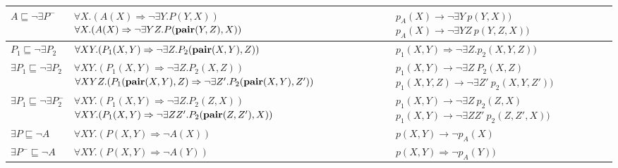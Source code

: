 \begin{longtable}{| p{2cm} | p{8.2cm} | p{5.2cm} |}
	\hline
		$A \sqsubseteq \neg \exists P^{-}$	
		&
		$\forall X. (A(X) \Rightarrow \neg \exists Y. P(Y,X)) $ \newline
		$\forall X. (A(X) \Rightarrow \neg \exists Y Z. P(\pair{Y,Z},X)) $
		&
$p_A(X) \rightarrow \neg \exists Y~p(Y,X)) $ \newline
		$p_A(X) \rightarrow \neg \exists Y Z~ p(Y,Z,X)) $
	\\
	
	\hline
		$P_1 \sqsubseteq \neg \exists P_2$	
		&
		$\forall X Y. (P_1(X,Y) \Rightarrow \neg \exists Z. P_2(\pair{X,Y},Z))$
		&
		$p_1(X,Y) \Rightarrow \neg \exists Z. p_2(X,Y,Z))$
	\\
	
	\hline
		$\exists P_1 \sqsubseteq \neg \exists P_2$	
		&
		$\forall X Y. (P_1(X,Y) \Rightarrow \neg \exists Z. P_2(X,Z)) $ \newline
		$\forall X  Y Z .(P_1(\pair{X,Y},Z) \Rightarrow \neg \exists Z' . P_2(\pair{X,Y},Z'))$
		&
		$p_1(X,Y) \rightarrow \neg \exists Z~P_2(X,Z) $ \newline
		$p_1(X,Y,Z) \rightarrow \neg \exists Z' ~p_2(X,Y,Z'))$
	\\
	
	\hline
		$\exists P_1 \sqsubseteq \neg \exists P_2^{-}$	
		&
		$\forall X  Y. (P_1(X,Y) \Rightarrow \neg \exists Z. P_2(Z,X)) $ \newline
		$\forall X  Y. (P_1(X,Y) \Rightarrow \neg \exists Z  Z' . P_2(\pair{Z,Z'},X)) $
		&
		$p_1(X,Y) \rightarrow \neg \exists Z~ p_2(Z,X) $ \newline
		$p_1(X,Y) \rightarrow \neg \exists Z  Z' ~p_2(Z,Z',X)) $
	\\
	
	\hline
		$\exists P \sqsubseteq \neg A$
		&
		$\forall X Y. (P(X,Y) \Rightarrow \neg A(X)) $
		&
$p(X,Y) \rightarrow \neg p_A(X) $
	\\
	
	\hline
		$\exists P^{-} \sqsubseteq \neg A$
		&
		$\forall X  Y. (P(X,Y) \Rightarrow \neg A(Y)) $
		&

	$p(X,Y) \Rightarrow \neg p_A(Y)) $
	\\
	\hline
	
\end{longtable}


